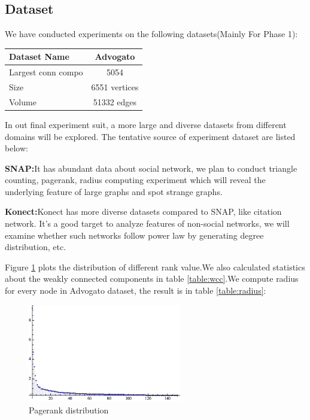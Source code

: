 \subsection{Dataset}
We have conducted experiments on the following datasets(Mainly For Phase 1):
\begin{center}
\begin{tabular}{| l | c |}
  \hline                        
  Dataset Name & Advogato  \\ \hline
  Largest conn compo & 5054  \\ \hline
  Size & 6551 vertices  \\ \hline
  Volume & 51332 edges \\ \hline
\end{tabular}
\end{center}

In out final experiment suit, a more large and diverse datasets from different domains will be explored. The tentative source of experiment dataset are listed below:
\begin{description}
	\item{{\bf SNAP:}}{It has abundant data about social network, we plan to conduct triangle counting, pagerank, radius computing experiment which will reveal the underlying feature of large graphs and spot strange graphs.}
	\item{{\bf Konect:}}{Konect has more diverse datasets compared to SNAP, like citation network. It's a good target to analyze features of non-social networks, we will examine whether such networks follow power law by generating degree distribution, etc.}
\end{description}

Figure \ref{fig:pagerank} plots the distribution of different rank value.We also calculated statistics about the weakly connected components in table \ref{table:wcc}.We compute radius for every node in Advogato dataset, the result is in table \ref{table:radius}:















\begin{figure}[htbf]
\begin{center}
     \includegraphics[width=0.6\textwidth]{FIG/pagerank.png}
\caption{Pagerank distribution}
\label{fig:pagerank}
\end{center}
\end{figure}


